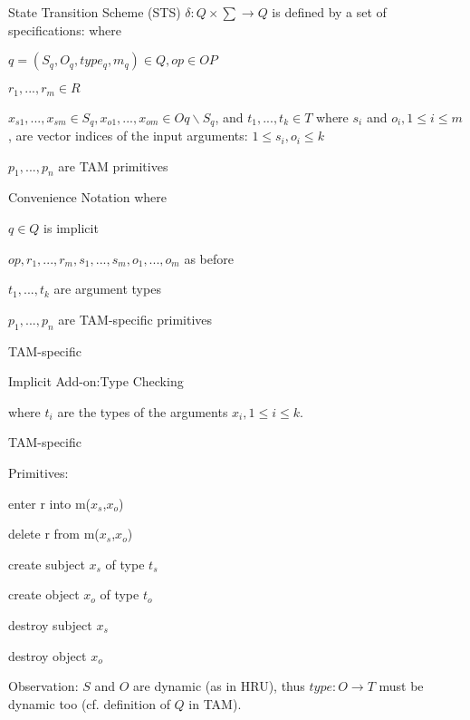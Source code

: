 \documentclass[a4paper]{article}
\begin{document}
\begin{multicols}{3}
    State Transition Scheme (STS)
    $\delta:Q\times\sum\rightarrow Q$ is defined by a set of specifications:
    where
    \begin{itemize*}
        \item $q= (S_q,O_q,type_q,m_q)\in Q,op\in OP$
        \item $r_1,...,r_m\in R$
        \item $x_{s1},...,x_{sm}\in S_q,x_{o1},...,x_{om}\in Oq\backslash S_q$, and $t_1,...,t_k\in T$ where $s_i$ and $o_i, 1\leq i\leq m$ , are vector indices of the input arguments: $1\leq s_i,o_i\leq k$
        \item $p_1,...,p_n$ are TAM primitives
    \end{itemize*}

    Convenience Notation where
    \begin{itemize*}
        \item %
        \item $q\in Q$ is implicit
        \item $op,r_1 ,...,r_m,s_1 ,...,s_m,o_1 ,...,o_m$ as before
        \item $t_1 ,...,t_k$ are argument types
        \item $p_1 ,...,p_n$ are TAM-specific primitives
    \end{itemize*}

    TAM-specific
    \begin{itemize*}
        \item Implicit Add-on:Type Checking
        \item %
        \item where $t_i$ are the types of the arguments $x_i, 1\leq i\leq k$.
    \end{itemize*}

    TAM-specific
    \begin{itemize*}
        \item Primitives:
              \begin{itemize*}
                  \item enter r into m($x_s$,$x_o$)
                  \item delete r from m($x_s$,$x_o$)
                  \item create subject $x_s$ of type $t_s$
                  \item create object $x_o$ of type $t_o$
                  \item destroy subject $x_s$
                  \item destroy object $x_o$
              \end{itemize*}
        \item Observation: $S$ and $O$ are dynamic (as in HRU), thus $type:O\rightarrow T$ must be dynamic too (cf. definition of $Q$ in TAM).
    \end{itemize*}


\end{multicols}
\end{document}
